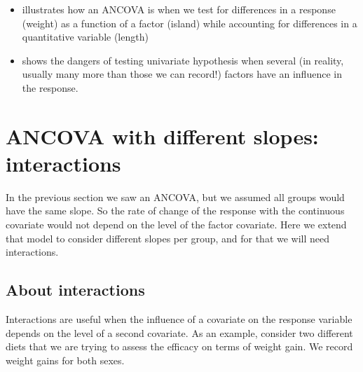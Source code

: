\documentclass[
]{book}
\begin{document}
\begin{itemize}
\item
  illustrates how an ANCOVA is when we test for differences in a response (weight) as a function of a factor (island) while accounting for differences in a quantitative variable (length)
\item
  shows the dangers of testing univariate hypothesis when several (in reality, usually many more than those we can record!) factors have an influence in the response.
\end{itemize}

\hypertarget{ANCOVAdifslopes}{%
\chapter{ANCOVA with different slopes: interactions}\label{ANCOVAdifslopes}}

In the previous section we saw an ANCOVA, but we assumed all groups would have the same slope. So the rate of change of the response with the continuous covariate would not depend on the level of the factor covariate. Here we extend that model to consider different slopes per group, and for that we will need interactions.

\hypertarget{about-interactions}{%
\section{About interactions}\label{about-interactions}}

Interactions are useful when the influence of a covariate on the response variable depends on the level of a second covariate. As an example, consider two different diets that we are trying to assess the efficacy on terms of weight gain. We record weight gains for both sexes.
\end{document}
